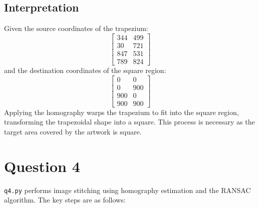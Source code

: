 \documentclass{article}
\begin{document}
\subsection{Interpretation}
Given the source coordinates of the trapezium:
\[
\begin{bmatrix}
344 & 499 \\
30 & 721 \\
847 & 531 \\
789 & 824
\end{bmatrix}
\]
and the destination coordinates of the square region:
\[
\begin{bmatrix}
0 & 0 \\
0 & 900 \\
900 & 0 \\
900 & 900
\end{bmatrix}
\]
Applying the homography warps the trapezium to fit into the square region, transforming the trapezoidal shape into a square. This process is necessary as the target area covered by the artwork is square.

\section{Question 4}

\texttt{q4.py} performs image stitching using homography estimation and the RANSAC algorithm. The key steps are as follows: 
\end{document}
